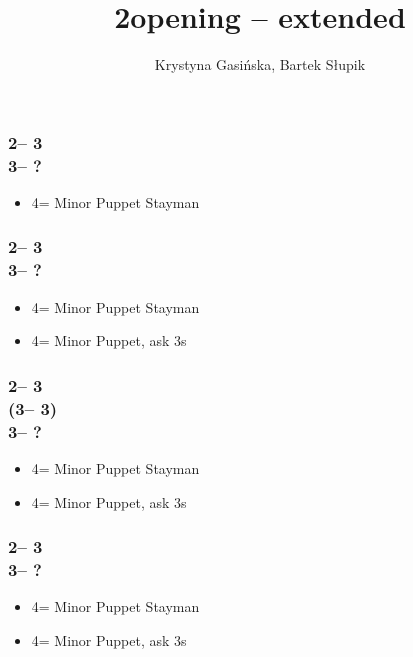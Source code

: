 \documentclass[12pt, a4paper]{article}
\title{2\nt opening -- extended}
\author{Krystyna Gasińska, Bartek Słupik}
\begin{document}
\maketitle


\subsubsection*{2\nt -- 3\clubs\\
                3\diams -- ?}
\begin{itemize}
    \item 4\clubs = Minor Puppet Stayman
\end{itemize}

\subsubsection*{2\nt -- 3\clubs\\
                3\major -- ?}
\begin{itemize}
    \item 4\clubs = Minor Puppet Stayman
    \item 4\diams = Minor Puppet, ask 3s
\end{itemize}

\subsubsection*{2\nt -- 3\clubs\\
                (3\diams -- 3\major)\\
                3\nt -- ?}
\begin{itemize}
    \item 4\clubs = Minor Puppet Stayman
    \item 4\diams = Minor Puppet, ask 3s
\end{itemize}

\subsubsection*{2\nt -- 3\diams\\
                3\hearts -- ?}
\begin{itemize}
    \item 4\clubs = Minor Puppet Stayman
    \item 4\diams = Minor Puppet, ask 3s
\end{itemize}
\end{document}
